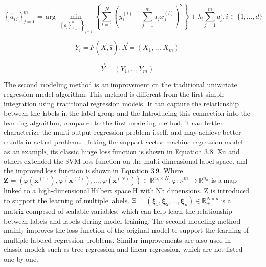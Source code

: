 \documentclass[twoside]{article}
\begin{document}
\begin{multicols}{2}
\begin{equation}
\left\{\hat{a}_{i j}\right\}_{j=1}^{m}=\arg \min _{\left.\left\{a_{j}\right\}_{j=1}^{n}\right\}_{j=1}}\left\{\sum_{l=1}^{N}\left(y_{i}^{(l)}-\sum_{j=1}^{m} a_{j} x_{j}^{(l)}\right)^{2}\right\}+\lambda_{i} \sum_{j=1}^{m} a_{j}^{2}, i \in\{1, \ldots, d\}
\end{equation}

\begin{equation}
Y_{i}=F(\vec{X}, \hat{a}), \vec{X}=\left(X_{1}, \ldots, X_{m}\right)
\end{equation}

\begin{equation}
\vec{Y}=\left(Y_{1}, \ldots, Y_{m}\right)
\end{equation}

The second modeling method is an improvement on the traditional univariate regression model algorithm. This method is different from the first simple integration using traditional regression models. It can capture the relationship between the labels in the label group and the Introducing this connection into the learning algorithm, compared to the first modeling method, it can better characterize the multi-output regression problem itself, and may achieve better results in actual problems.
Taking the support vector machine regression model as an example, its classic hinge loss function is shown in Equation 3.8. Xu\cite{tyz75} and others extended the SVM loss function on the multi-dimensional label space, and the improved loss function is shown in Equation 3.9.
Where $\mathbf{Z}=\left(\varphi\left(\mathbf{x}^{(1)}\right), \varphi\left(\mathbf{x}^{(2)}\right), \ldots, \varphi\left(\mathbf{x}^{(N)}\right)\right) \in \mathbb{R}^{n_{h} \times N}, \varphi: \mathbb{R}^{m} \rightarrow \mathbb{R}^{n_{h}}$ is a map linked to a high-dimensional Hilbert space H with Nh dimensions. Z is introduced to support the learning of multiple labels.
$\boldsymbol{\Xi}=\left(\boldsymbol{\xi}_{1}, \boldsymbol{\xi}_{2}, \ldots, \boldsymbol{\xi}_{d}\right) \in \mathbb{R}_{+}^{N \times d}$ is a matrix composed of scalable variables, which can help learn the relationship between labels and labels during model training.
The second modeling method mainly improves the loss function of the original model to support the learning of multiple labeled regression problems. Similar improvements are also used in classic models such as tree regression and linear regression, which are not listed one by one.


\end{multicols}
\end{document}
